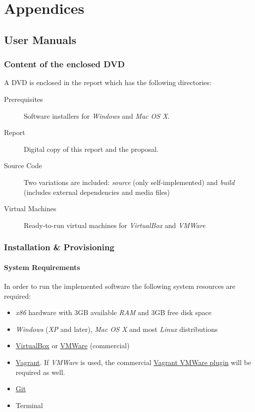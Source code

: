 \chapter*{Appendices}
\renewcommand{\thesection}{\Alph{section}}

\section{User Manuals}

\subsection{Content of the enclosed DVD}

A DVD is enclosed in the report which has the following directories:

\begin{description}
    \item[Prerequisites] Software installers for \emph{Windows} and \emph{Mac OS X}.
    \item[Report] Digital copy of this report and the proposal.
    \item[Source Code] Two variations are included: \emph{source} (only self-implemented) and \emph{build} (includes external dependencies and media files)
    \item[Virtual Machines] Ready-to-run virtual machines for \emph{VirtualBox} and \emph{VMWare}
\end{description}

\subsection{Installation \& Provisioning}

\subsubsection{System Requirements}

In order to run the implemented software the following system resources are required:

\begin{itemize}
\item \emph{x86} hardware with 3GB available \emph{RAM} and 3GB free disk space
\item \emph{Windows} (\emph{XP} and later), \emph{Mac OS X} and most \emph{Linux} distributions
\item \href{https://www.virtualbox.org/wiki/Downloads}{VirtualBox} or \href{http://www.vmware.com/products/fusion/}{VMWare} (commercial)
\item \href{http://www.vagrantup.com/downloads.html}{Vagrant}. If \emph{VMWare} is used, the commercial \href{https://www.vagrantup.com/vmware}{Vagrant VMWare plugin} will be required as well.
\item \href{https://git-scm.com/}{Git}
\item Terminal
\end{itemize}

